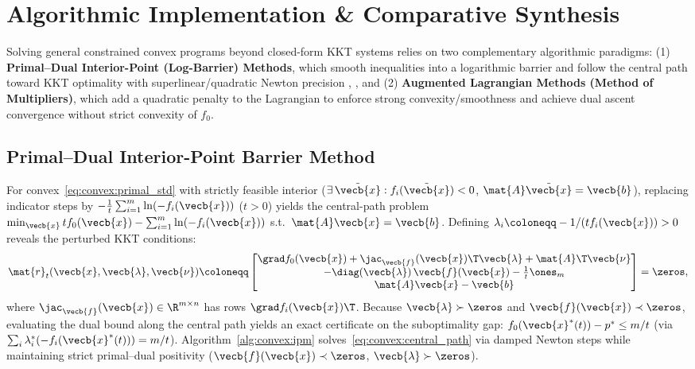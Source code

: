 \documentclass[../../../../master.tex]{subfiles}
\begin{document}
\section{Algorithmic Implementation \& Comparative Synthesis}
\label{sec:convex:algorithms}

Solving general constrained convex programs beyond closed-form KKT systems relies on two complementary algorithmic paradigms: (1) \textbf{Primal--Dual Interior-Point (Log-Barrier) Methods}, which smooth inequalities into a logarithmic barrier and follow the central path toward KKT optimality with superlinear/quadratic Newton precision , , and (2) \textbf{Augmented Lagrangian Methods (Method of Multipliers)}, which add a quadratic penalty to the Lagrangian to enforce strong convexity/smoothness and achieve dual ascent convergence without strict convexity of $f_0$.

\subsection{Primal--Dual Interior-Point Barrier Method}

For convex~\eqref{eq:convex:primal_std} with strictly feasible interior ($\exists\,\tilde{\vecb{x}} : f_i(\tilde{\vecb{x}}) < 0$, $\mat{A}\tilde{\vecb{x}} = \vecb{b}$), replacing indicator steps by $-\frac{1}{t}\sum_{i=1}^m \ln(-f_i(\vecb{x}))$ ($t > 0$) yields the central-path problem $\min_{\vecb{x}} t f_0(\vecb{x}) - \sum_{i=1}^m \ln(-f_i(\vecb{x}))$ s.t.\ $\mat{A}\vecb{x} = \vecb{b}$. Defining $\lambda_i \coloneqq -1 / (t f_i(\vecb{x})) > 0$ reveals the perturbed KKT conditions:
\begin{equation}
  \mat{r}_t(\vecb{x}, \vecb{\lambda}, \vecb{\nu}) \coloneqq
  \begin{bmatrix}
    \grad f_0(\vecb{x}) + \jac_{\vecb{f}}(\vecb{x})\T \vecb{\lambda} + \mat{A}\T\vecb{\nu} \\
    -\diag(\vecb{\lambda})\,\vecb{f}(\vecb{x}) - \frac{1}{t}\ones_m \\
    \mat{A}\vecb{x} - \vecb{b}
  \end{bmatrix} = \zeros,
  \label{eq:convex:central_path}
\end{equation}
where $\jac_{\vecb{f}}(\vecb{x}) \in \R^{m \times n}$ has rows $\grad f_i(\vecb{x})\T$. Because $\vecb{\lambda} \succ \zeros$ and $\vecb{f}(\vecb{x}) \prec \zeros$, evaluating the dual bound along the central path yields an exact certificate on the suboptimality gap: $f_0(\vecb{x}^*(t)) - p^* \le m / t$ (via $\sum_i \lambda_i^* (-f_i(\vecb{x}^*(t))) = m/t$). Algorithm~\ref{alg:convex:ipm} solves~\eqref{eq:convex:central_path} via damped Newton steps while maintaining strict primal--dual positivity ($\vecb{f}(\vecb{x}) \prec \zeros$, $\vecb{\lambda} \succ \zeros$).
\end{document}
